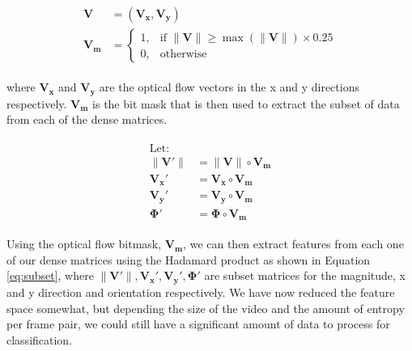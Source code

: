\begin{align}
  \label{eq:optical_threshold}
  \begin{split}
  \mathbf{V} &= (\mathbf{V_x}, \mathbf{V_y}) \\
  \mathbf{V_m} &=
  \begin{cases}
    1, & \text{if } \|\mathbf{V}\| \geq \max( \|\mathbf{V}\|) \times 0.25 \\
    0, & \text{otherwise}
  \end{cases}
  \end{split}
\end{align}

where $\mathbf{V_x}$ and $\mathbf{V_y}$ are the optical flow vectors in the
x and y directions respectively. $\mathbf{V_m}$ is the bit mask that is
then used to extract the subset of data from each of the dense matrices.

\begin{align}
  \label{eq:subset}
  \begin{split}
  \text{Let: } \\
  \|\mathbf{V\prime}\| &= \|\mathbf{V}\| \circ \mathbf{V_m}\\
  \mathbf{V_x\prime} &= \mathbf{V_x} \circ \mathbf{V_m}\\
  \mathbf{V_y\prime} &= \mathbf{V_y} \circ \mathbf{V_m}\\
  \mathbf{\Phi\prime} &= \mathbf{\Phi} \circ \mathbf{V_m}
\end{split}
\end{align}

Using the optical flow bitmask, $\mathbf{V_m}$, we can then extract features
from each one of our dense matrices using the Hadamard product as shown in
Equation \ref{eq:subset}, where $\|\mathbf{V\prime}\|,
\mathbf{V_x\prime},\mathbf{V_y\prime}, \mathbf{\Phi\prime}$ are subset matrices
for the magnitude, x and y direction and orientation respectively. We have now
reduced the feature space somewhat, but depending the size of the video and the
amount of entropy per frame pair, we could still have a significant amount of
data to process for classification.

